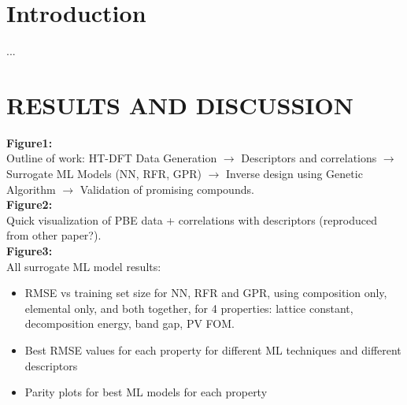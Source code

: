 \documentclass[]{revtex4-2}
\begin{document}
\section*{Introduction}

... \\



\section*{RESULTS AND DISCUSSION}

\textbf{Figure1:} \\
Outline of work: HT-DFT Data Generation $\rightarrow$ Descriptors and correlations $\rightarrow$ Surrogate ML Models (NN, RFR, GPR) $\rightarrow$ Inverse design using Genetic Algorithm $\rightarrow$ Validation of promising compounds. \\

\textbf{Figure2:} \\
Quick visualization of PBE data + correlations with descriptors (reproduced from other paper?). \\

\textbf{Figure3:} \\
All surrogate ML model results: 
\begin{itemize}
\item RMSE vs training set size for NN, RFR and GPR, using composition only, elemental only, and both together, for 4 properties: lattice constant, decomposition energy, band gap, PV FOM.
\item Best RMSE values for each property for different ML techniques and different descriptors
\item Parity plots for best ML models for each property
\end{itemize} \\
\end{document}
